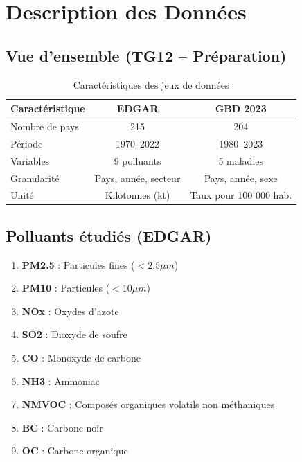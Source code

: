\documentclass[11pt,a4paper]{article}
\begin{document}
\clearpage

\clearpage

\section{Description des Données}

\subsection{Vue d'ensemble (TG12 -- Préparation)}

\begin{table}[H]
\centering
\caption{Caractéristiques des jeux de données}
\begin{tabular}{lcc}
\toprule
\textbf{Caractéristique} & \textbf{EDGAR} & \textbf{GBD 2023} \\
\midrule
Nombre de pays & 215 & 204 \\
Période & 1970--2022 & 1980--2023 \\
Variables & 9 polluants & 5 maladies \\
Granularité & Pays, année, secteur & Pays, année, sexe \\
Unité & Kilotonnes (kt) & Taux pour 100 000 hab. \\
\bottomrule
\end{tabular}
\end{table}

\subsection{Polluants étudiés (EDGAR)}

\begin{enumerate}[noitemsep]
    \item \textbf{PM2.5} : Particules fines ($< 2.5 \mu m$)
    \item \textbf{PM10} : Particules ($< 10 \mu m$)
    \item \textbf{NOx} : Oxydes d'azote
    \item \textbf{SO2} : Dioxyde de soufre
    \item \textbf{CO} : Monoxyde de carbone
    \item \textbf{NH3} : Ammoniac
    \item \textbf{NMVOC} : Composés organiques volatils non méthaniques
    \item \textbf{BC} : Carbone noir
    \item \textbf{OC} : Carbone organique
\end{enumerate}
\end{document}
